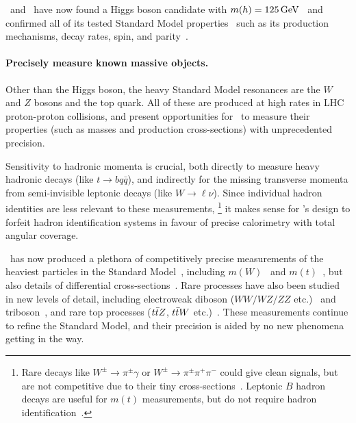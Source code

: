 \atlas\ and \cms\ have now found a Higgs boson candidate with
$m(h) = 125\,\eV[G]$~\cite{
atlas2012higgs,
atlas2012combined,
cms2012higgs
}
and confirmed all of its tested Standard Model properties~\cite{
combined2016higgs,
atlas2022ten,
cms2022ten
}
such as its production mechanisms, decay rates,
spin, and parity~\cite{
HIGG-2013-01,
HIGG-2013-17,
HIGG-2014-06
}.

\paragraph{Precisely measure known massive objects.}
Other than the Higgs boson, the heavy Standard Model resonances are the
$W$ and $Z$ bosons and the top quark.
All of these are produced at high rates in LHC proton-proton collisions,
and present opportunities for \atlas\ to measure their properties
(such as masses and production cross-sections) with unprecedented precision.

Sensitivity to hadronic momenta is crucial,
both directly to measure heavy hadronic decays
(like $t \to bq\bar{q}$),
and indirectly for the missing transverse momenta from semi-invisible
leptonic decays (like $W \to \ell\nu$).
Since individual hadron identities are less relevant to these measurements,%
\footnote{%
Rare decays like
$W^\pm \to \pi^\pm \gamma$ or $W^\pm \to \pi^\pm \pi^+ \pi^-$
could give clean signals, but are not competitive due to their
tiny cross-sections~\cite{
cdf1996search,
mangano2014wpiy,
cms2021wpiy
}.
Leptonic $B$ hadron decays are useful for $m(t)$ measurements, but do not
require hadron identification~\cite{
CDF:2009mbf,
CMS:2016ixg,
ATLAS:2022jbw
}.%
}
it makes sense for \atlas's design to forfeit hadron identification systems
in favour of precise calorimetry with total angular coverage.

\atlas\ has now produced a plethora of competitively precise measurements
of the heaviest particles in the Standard Model~\cite{atlas2021summarysm},
including $m(W)$~\cite{atlas2018wmass} and
$m(t)$~\cite{atlas2022symmarytop, atlas2019topmass, TOPQ-2015-03},
but also details of differential cross-sections~\cite{
STDM-2016-11,
STDM-2016-14,
TOPQ-2018-15,
TOPQ-2016-10
}.
Rare processes have also been studied in new levels of detail,
including
electroweak diboson ($WW/WZ/ZZ$ etc.)~\cite{
STDM-2015-21,
STDM-2015-23,
STDM-2017-09
}
and triboson~\cite{
STDM-2016-06,
STDM-2017-22,
STDM-2019-09
},
and rare top processes
($\ttbar Z$, $\ttbar W$ etc.)~\cite{
TOPQ-2013-05,
TOPQ-2018-01,
TOPQ-2020-03
}.
These measurements continue to refine the Standard Model, and their precision
is aided by no new phenomena getting in the way.

